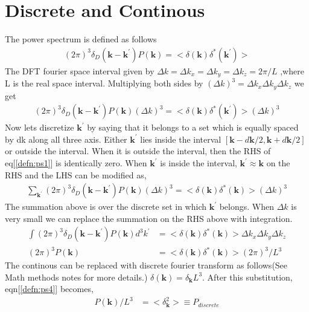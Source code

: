 \documentclass{article}
\begin{document}
\section{Discrete and Continous}
The power spectrum is defined as follows
\begin{align}
(2 \pi)^3 \delta_{D}(\bm{k}-\bm{k^{\prime}}) P(\bm{k}) = <\delta(\bm{k})\delta^*(\bm{k^{\prime }})> \label{defn:ps}
\end{align}
The DFT fourier space interval given by $\Delta k=\Delta k_{x}=\Delta k_{y}=\Delta k_{z} = 2 \pi/L$ ,where L is the real space interval. Multiplying both sides by $(\Delta k)^3 = \Delta k_x \Delta k_y \Delta k_z$ we get
\begin{align}
(2 \pi)^3 \delta_{D}(\bm{k}-\bm{k^{\prime}}) P(\bm{k})(\Delta k)^3 = <\delta(\bm{k})\delta^*(\bm{k^{\prime}})> (\Delta k)^3   \label{defn:ps1}
\end{align} 
Now lets discretize $\bm{k}^{\prime}$ by saying that it belongs to a set which is equally spaced by dk along all three axis. Either $\bm{k}^{\prime}$ lies inside the interval  $[\bm{k}-d\bm{k}/2,\bm{k}+d\bm{k}/2]$ or outside the interval. When it is outside the interval,
then the RHS of eq[\ref{defn:ps1}] is identically zero. When $\bm{k}^{\prime}$ is inside the interval, $\bm{k}^{\prime} \approx \bm{k}$ on the RHS and the LHS can be modified as,
\begin{align}
\sum_{\bm{k^{\prime}}}^{}(2 \pi)^3 \delta_{D}(\bm{k}-\bm{k^{\prime}}) P(\bm{k})(\Delta k)^3 = <\delta(\bm{k})\delta^*(\bm{k})> (\Delta k)^3   \label{defn:ps2}
\end{align}
The summation above is over the discrete set in which $\bm{k}^{\prime}$ belongs. When $\Delta k$ is very small we can replace the summation on the RHS above with integration.
\begin{align}
\int (2 \pi)^3 \delta_{D}(\bm{k}-\bm{k^{\prime}}) P(\bm{k})d^3k^{\prime} &= <\delta(\bm{k})\delta^*(\bm{k})> \Delta k_x \Delta k_y \Delta k_z   \label{defn:ps3}\\
(2 \pi)^3 P(\bm{k} )&=<\delta(\bm{k})\delta^*(\bm{k})> (2 \pi)^3/L^3  \label{defn:ps4}
\end{align}
The continous can be replaced with discrete fourier transform as follows(See Math methods notes for more details.)
$\delta(\bm{k}) = \delta_{\bm{k}} L^3$. After this substitution, eqn[\ref{defn:ps4}] becomes,
\begin{align}
P(\bm{k})/L^3&=<\delta_{\bm{k}}^2> \equiv P_{discrete}
\end{align}
\end{document}
